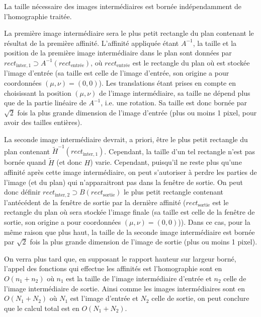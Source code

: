 \begin{prop}
  La taille nécessaire des images intermédiaires est bornée indépendamment de l'homographie traitée.
 \end{prop}
 
 La première image intermédiaire sera le plus petit rectangle du plan contenant le résultat de la première affinité. L'affinité appliquée étant $A^{-1}$, la taille et la position de la première image intermédiaire dans le plan sont données par $rect_{\text{inter},1} \supset A^{-1}(rect_\text{entrée})$, où $rect_\text{entrée}$ est le rectangle du plan où est stockée l'image d'entrée (sa taille est celle de l'image d'entrée, son origine a pour coordonnées $(\mu,\nu)=(0,0)$). Les translations étant prises en compte en choisissant la position $(\mu,\nu)$ de l'image intermédiaire, sa taille ne dépend plus que de la partie linéaire de $A^{-1}$, i.e. une rotation. Sa taille est donc bornée par $\sqrt{2}$ fois la plus grande dimension de l'image d'entrée (plus ou moins 1 pixel, pour avoir des tailles entières).
 
 La seconde image intermédiaire devrait, a priori, être le plus petit rectangle du plan contenant $\tilde H^{-1}(rect_{\text{inter},1})$. Cependant, la taille d'un tel rectangle n'est pas bornée quand $\tilde H$ (et donc $H$) varie. Cependant, puisqu'il ne reste plus qu'une affinité après cette image intermédiaire, on peut s'autoriser à perdre les parties de l'image (et du plan) qui n'apparaitront pas dans la fenêtre de sortie. On peut donc définir $rect_{\text{inter},2} \supset B(rect_{\text{sortie}})$ le plus petit rectangle contenant l'antécédent de la fenêtre de sortie par la dernière affinité ($rect_{\text{sortie}}$ est le rectangle du plan où sera stockée l'image finale (sa taille est celle de la fenêtre de sortie, son origine a pour coordonnées $(\mu,\nu)=(0,0)$)). Dans ce cas, pour la même raison que plus haut, la taille de la seconde image intermédiaire est bornée par $\sqrt{2}$ fois la plus grande dimension de l'image de sortie (plus ou moins 1 pixel).
 
On verra plus tard que, en supposant le rapport hauteur sur largeur borné, l'appel des fonctions qui effectue les affinités est l'homographie sont en $O(n_1+n_2)$ où $n_1$ est la taille de l'image intermédiaire d'entrée et $n_2$ celle de l'image intermédiaire de sortie. Ainsi comme les images intermédiaires sont en $O(N_1+N_2)$ où $N_1$ est l'image d'entrée et $N_2$ celle de sortie, on peut conclure que le calcul total est en $O(N_1+N_2)$.
